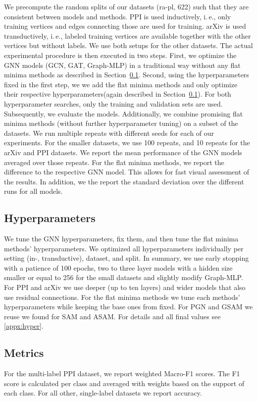 \documentclass[runningheads]{llncs}
\newcommand{\ie}{i.\,e.,\xspace}
\newcommand{\GraphMLP}{Graph-MLP\xspace}
\begin{document}
We precompute the random splits of our datasets (ra-pl, 622) such that they are consistent between models and methods.
PPI is used inductively, \ie only training vertices and edges connecting those are used for training. 
arXiv is used transductively, \ie labeled training vertices are available together with the other vertices but without labels.
We use both setups for the other datasets.
The actual experimental procedure is then executed in two steps.
First, we optimize the GNN models (GCN, GAT, \GraphMLP) in a traditional way without any flat minima methods as described in Section~\ref{sec:hyper}.
Second, using the hyperparameters fixed in the first step, we we add the flat minima methods and only optimize their respective hyperparameters(again described in Section~\ref{sec:hyper}).
For both hyperparameter searches, only the training and validation sets are used.
Subsequently, we evaluate the models.
Additionally, we combine promising flat minima methods (without further hyperparameter tuning) on a subset of the datasets.
We run multiple repeats with different seeds for each of our experiments.
For the smaller datasets, we use 100 repeats, and 10 repeats for the arXiv and PPI datasets.
We report the mean performance of the GNN models averaged over those repeats.
For the flat minima methods, we report the difference to the respective GNN model.
This allows for fast visual assessment of the results.
In addition, we the report the standard deviation over the different runs for all models.




\subsection{Hyperparameters}
\label{sec:hyper}
We tune the GNN hyperparameters, fix them, and then tune the flat minima methods' hyperparameters.
We optimized all hyperparameters individually per setting (in-, transductive), dataset, and split.
In summary, we use early stopping with a patience of 100 epochs, two to three layer models with a hidden size smaller or equal to 256 for the small datasets and slightly modify \GraphMLP.
For PPI and arXiv we use deeper (up to ten layers) and wider models that also use residual connections.
For the flat minima methods we tune each methods' hyperparameters while keeping the base ones from fixed.
For PGN and GSAM we reuse  we found for SAM and ASAM.
For details and all final values see \ref{appx:hyper}.

\subsection{Metrics}
For the multi-label PPI dataset, we report weighted Macro-F1 scores.
The F1 score is calculated per class and averaged with weights based on the support of each class.
For all other, single-label datasets we report accuracy.
\end{document}

